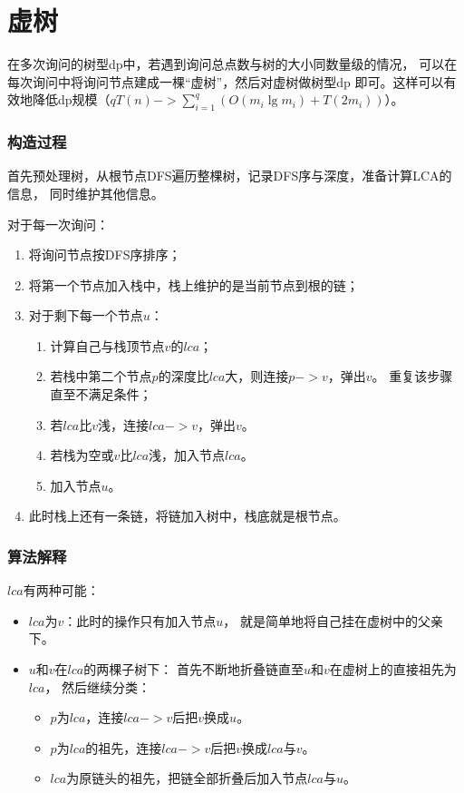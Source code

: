 \section{虚树}
在多次询问的树型dp中，若遇到询问总点数与树的大小同数量级的情况，
可以在每次询问中将询问节点建成一棵``虚树''，然后对虚树做树型dp
即可。这样可以有效地降低dp规模（$\displaystyle qT(n)->
\sum_{i=1}^q{\left(O(m_i\lg m_i)+T(2m_i)\right)}$）。

\subsubsection{构造过程}

首先预处理树，从根节点DFS遍历整棵树，记录DFS序与深度，准备计算LCA的信息，
同时维护其他信息。

对于每一次询问：
\begin{enumerate}
    \item 将询问节点按DFS序排序；
    \item 将第一个节点加入栈中，栈上维护的是当前节点到根的链；
    \item 对于剩下每一个节点$u$：
    \begin{enumerate}
        \item 计算自己与栈顶节点$v$的$lca$；
        \item 若栈中第二个节点$p$的深度比$lca$大，则连接$p->v$，弹出$v$。
        重复该步骤直至不满足条件；
        \item 若$lca$比$v$浅，连接$lca->v$，弹出$v$。
        \item 若栈为空或$v$比$lca$浅，加入节点$lca$。
        \item 加入节点$u$。
    \end{enumerate}
    \item 此时栈上还有一条链，将链加入树中，栈底就是根节点。
\end{enumerate}
\subsubsection{算法解释}

$lca$有两种可能：
\begin{itemize}
    \item $lca$为$v$：此时的操作只有加入节点$u$，
    就是简单地将自己挂在虚树中的父亲下。
    \item $u$和$v$在$lca$的两棵子树下：
    首先不断地折叠链直至$u$和$v$在虚树上的直接祖先为$lca$，
    然后继续分类：
    \begin{itemize}
        \item $p$为$lca$，连接$lca->v$后把$v$换成$u$。
        \item $p$为$lca$的祖先，连接$lca->v$后把$v$换成$lca$与$v$。
        \item $lca$为原链头的祖先，把链全部折叠后加入节点$lca$与$u$。
    \end{itemize}
\end{itemize}

